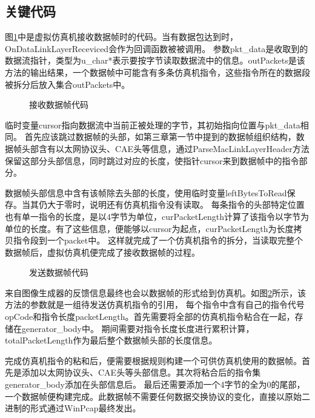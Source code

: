 \subsection{关键代码}
图\ref{codeSimRec}中是虚拟仿真机接收数据帧时的代码。当有数据包达到时，OnDataLinkLayerReceviced会作为回调函数被被调用。
参数pkt\_data是收取到的数据流指针，类型为u\_char*表示要按字节读取数据流中的信息。outPackets是该方法的输出结果，一个数据帧中可能含有多条仿真机指令，这些指令所在的数据段被拆分后放入集合outPackets中。
\begin{figure}[h!]
    \centering
     
    \caption{接收数据帧代码}
    \label{codeSimRec}
\end{figure}
\vspace{12pt}
\par
临时变量cursor指向数据流中当前正被处理的字节，其初始指向位置与pkt\_data相同。
首先应该跳过数据帧的头部，如第三章第一节中提到的数据帧组织结构，数据帧头部含有以太网协议头、CAE头等信息，通过ParseMacLinkLayerHeader方法保留这部分头部信息，同时跳过对应的长度，使指针cursor来到数据帧中的指令部分。
\par
数据帧头部信息中含有该帧除去头部的长度，使用临时变量leftBytesToRead保存。当其仍大于零时，说明还有仿真机指令没有读取。
每条指令的头部特定位置也有单一指令的长度，是以4字节为单位，curPacketLength计算了该指令以字节为单位的长度。有了这些信息，便能够以cursor为起点，curPacketLength为长度拷贝指令段到一个packet中。
这样就完成了一个仿真机指令的拆分，当读取完整个数据帧后，虚拟仿真机便完成了接收数据帧的过程。
\begin{figure}[h!]
    \centering
     
    \caption{发送数据帧代码}
    \label{codeSimSend}
\end{figure}

\par
来自图像生成器的反馈信息最终也会以数据帧的形式给到仿真机。如图\ref{codeSimSend}所示，该方法的参数就是一组待发送仿真机指令的引用，
每个指令中含有自己的指令代号opCode和指令长度packetLength。首先需要将全部的仿真机指令粘合在一起，存储在generator\_body中。
期间需要对指令长度长度进行累积计算，totalPacketLength作为最后整个数据帧头部的长度信息。
\par
完成仿真机指令的粘和后，便需要根据规则构建一个可供仿真机使用的数据帧。首先是添加以太网协议头、CAE头等头部信息。其次将粘合后的指令集generator\_body添加在头部信息后。
最后还需要添加一个4字节的全为0的尾部，一个数据帧便构建完成。此数据帧不需要任何数据交换协议的变化，直接以原始二进制的形式通过WinPcap最终发出。


